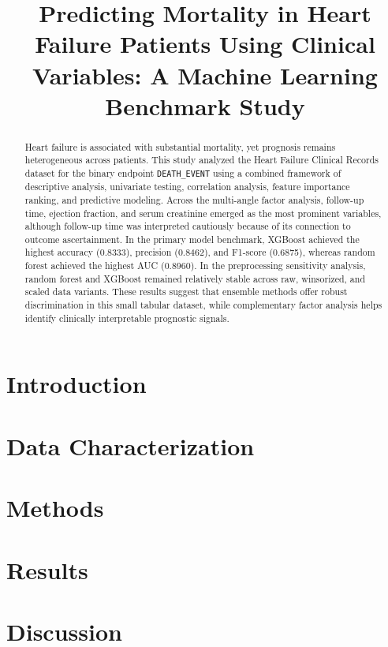 \documentclass[11pt]{article}
\title{Predicting Mortality in Heart Failure Patients Using Clinical Variables: A Machine Learning Benchmark Study}
\author{}
\date{}
\begin{document}
\maketitle

\begin{abstract}
Heart failure is associated with substantial mortality, yet prognosis remains heterogeneous across patients. This study analyzed the Heart Failure Clinical Records dataset for the binary endpoint \texttt{DEATH\_EVENT} using a combined framework of descriptive analysis, univariate testing, correlation analysis, feature importance ranking, and predictive modeling. Across the multi-angle factor analysis, follow-up time, ejection fraction, and serum creatinine emerged as the most prominent variables, although follow-up time was interpreted cautiously because of its connection to outcome ascertainment. In the primary model benchmark, XGBoost achieved the highest accuracy (0.8333), precision (0.8462), and F1-score (0.6875), whereas random forest achieved the highest AUC (0.8960). In the preprocessing sensitivity analysis, random forest and XGBoost remained relatively stable across raw, winsorized, and scaled data variants. These results suggest that ensemble methods offer robust discrimination in this small tabular dataset, while complementary factor analysis helps identify clinically interpretable prognostic signals.
\end{abstract}

\section{Introduction}


\section{Data Characterization}


\section{Methods}


\section{Results}


\section{Discussion}




\end{document}
